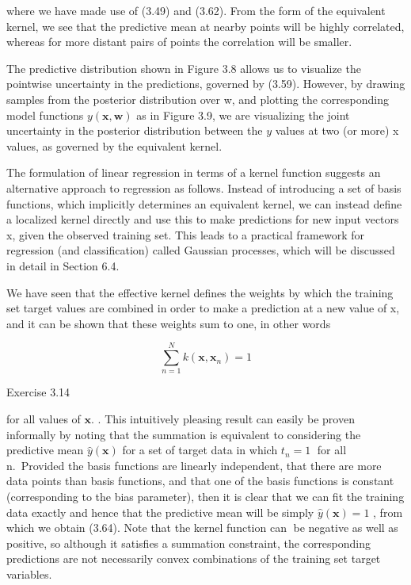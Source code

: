 \documentclass[
  10
]{article}
\begin{document}
where we have made use of (3.49) and (3.62). From the form of the
equivalent kernel, we see that the predictive mean at nearby points will
be highly correlated, whereas for more distant pairs of points the
correlation will be smaller.

The predictive distribution shown in Figure 3.8 allows us to visualize
the pointwise uncertainty in the predictions, governed by (3.59).
However, by drawing samples from the posterior distribution over w, and
plotting the corresponding model functions
\(y ( \mathbf { x } , \mathbf { w } )\) as in Figure 3.9, we are
visualizing the joint uncertainty in the posterior distribution between
the \(y\) values at two (or more) x values, as governed by the
equivalent kernel.

The formulation of linear regression in terms of a kernel function
suggests an alternative approach to regression as follows. Instead of
introducing a set of basis functions, which implicitly determines an
equivalent kernel, we can instead define a localized kernel directly and
use this to make predictions for new input vectors x, given the observed
training set. This leads to a practical framework for regression (and
classification) called Gaussian processes, which will be discussed in
detail in Section 6.4.

We have seen that the effective kernel defines the weights by which the
training set target values are combined in order to make a prediction at
a new value of x, and it can be shown that these weights sum to one, in
other words

\[
\sum_ {n = 1} ^ {N} k (\mathbf {x}, \mathbf {x} _ {n}) = 1\tag{3.64}
\]

Exercise 3.14

for all values of \(\mathbf { x } .\) . This intuitively pleasing result
can easily be proven informally by noting that the summation is
equivalent to considering the predictive mean
\(\widehat { y } ( \mathbf x )\) for a set of target data in which
\(t _ { n } = 1\) for all n.~Provided the basis functions are linearly
independent, that there are more data points than basis functions, and
that one of the basis functions is constant (corresponding to the bias
parameter), then it is clear that we can fit the training data exactly
and hence that the predictive mean will be simply
\(\widehat { y } ( \mathbf { x } ) = 1\) , from which we obtain (3.64).
Note that the kernel function can be negative as well as positive, so
although it satisfies a summation constraint, the corresponding
predictions are not necessarily convex combinations of the training set
target variables.
\end{document}
